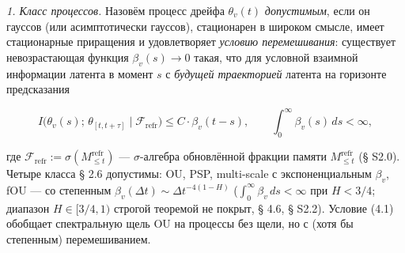 \documentclass[12pt]{iopart}
\begin{document}
\emph{1. Класс процессов.} Назовём процесс дрейфа \(\theta_v(t)\) \emph{допустимым}, если он гауссов (или асимптотически гауссов), стационарен в широком смысле, имеет стационарные приращения и удовлетворяет \emph{условию перемешивания}: существует невозрастающая функция \(\beta_v(s) \to 0\) такая, что для условной взаимной информации латента в момент \(s\) с \emph{будущей траекторией} латента на горизонте предсказания



\begin{equation}I\big(\theta_v(s);\, \theta_{[t,t+\tau]} \mid \mathcal F_{\text{refr}}\big) \le C\cdot\beta_v(t-s), \qquad \int_0^\infty \beta_v(s)\,ds < \infty, \tag{4.1}\end{equation}



где \(\mathcal F_{\text{refr}} := \sigma(M_{\le t}^{\text{refr}})\) --- \(\sigma\)-алгебра обновлённой фракции памяти \(M_{\le t}^{\text{refr}}\) (§ S2.0). Четыре класса § 2.6 допустимы: OU, PSP, multi-scale с экспоненциальным \(\beta_v\), fOU --- со степенным \(\beta_v(\Delta t)\sim\Delta t^{-4(1-H)}\) (\(\int_0^\infty\beta_v\,ds < \infty\) при \(H < 3/4\); диапазон \(H\in[3/4,1)\) строгой теоремой не покрыт, § 4.6, § S2.2). Условие (4.1) обобщает спектральную щель OU \cite{Andriishin2026b,Pavliotis2014} на процессы без щели, но с (хотя бы степенным) перемешиванием.
\end{document}
